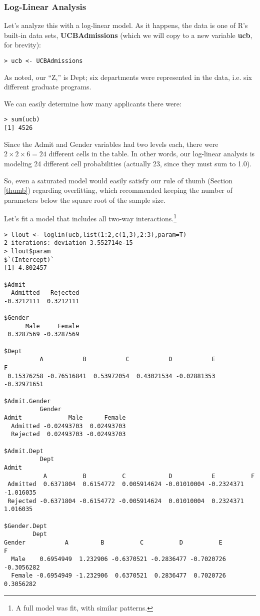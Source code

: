 \subsubsection{Log-Linear Analysis}

Let's analyze this with a log-linear model.  As it happens, the data is
one of R's built-in data sets, {\bf UCBAdmissions} (which we will copy
to a new variable {\bf ucb}, for brevity):

\begin{lstlisting}
> ucb <- UCBAdmissions
\end{lstlisting}

As noted, our ``Z,'' is Dept; six departments were represented in the
data, i.e. six different graduate programs.  

We can easily determine how many applicants there were:

\begin{lstlisting}
> sum(ucb)
[1] 4526
\end{lstlisting}

Since the Admit and Gender variables had two levels each, there were $2
\times 2 \times 6 = 24$ different cells in the table.  In other words,
our log-linear analysis is modeling 24 different cell probabilities
(actually 23, since they must sum to 1.0).

So, even a saturated model would easily satisfy our rule of thumb
(Section \ref{thumb}) regarding overfitting, which recommended keeping
the number of parameters below the square root of the sample size.

Let's fit a model that includes all two-way interactions.\footnote{A
full model was fit, with similar patterns.}

\begin{lstlisting}
> llout <- loglin(ucb,list(1:2,c(1,3),2:3),param=T)
2 iterations: deviation 3.552714e-15 
> llout$param
$`(Intercept)`
[1] 4.802457

$Admit
  Admitted   Rejected 
-0.3212111  0.3212111 

$Gender
      Male     Female 
 0.3287569 -0.3287569 

$Dept
          A           B           C           D           E           F 
 0.15376258 -0.76516841  0.53972054  0.43021534 -0.02881353 -0.32971651 

$Admit.Gender
          Gender
Admit             Male      Female
  Admitted -0.02493703  0.02493703
  Rejected  0.02493703 -0.02493703

$Admit.Dept
          Dept
Admit
           A          B          C            D           E          F
 Admitted  0.6371804  0.6154772  0.005914624 -0.01010004 -0.2324371 -1.016035
 Rejected -0.6371804 -0.6154772 -0.005914624  0.01010004  0.2324371  1.016035

$Gender.Dept
        Dept
Gender           A         B          C          D          E          F
  Male    0.6954949  1.232906 -0.6370521 -0.2836477 -0.7020726 -0.3056282
  Female -0.6954949 -1.232906  0.6370521  0.2836477  0.7020726  0.3056282
\end{lstlisting}

